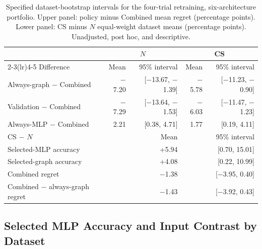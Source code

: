\begin{table}[tbp]
\centering
\caption{Specified dataset-bootstrap intervals for the four-trial retraining, six-architecture portfolio. Upper panel: policy minus Combined mean regret (percentage points). Lower panel: CS minus $N$ equal-weight dataset means (percentage points). Unadjusted, post hoc, and descriptive.}
\label{tab:mlp_budget_intervals}
\small
\begin{tabular}{@{}lrrrr@{}}
\toprule
 & \multicolumn{2}{c}{$N$} & \multicolumn{2}{c}{CS} \\
\cmidrule(lr){2-3}\cmidrule(lr){4-5}
Difference & Mean & 95\% interval & Mean & 95\% interval \\
\midrule
Always-graph $-$ Combined & $-$7.20 & [$-$13.67, $-$1.39] & $-$5.78 & [$-$11.23, $-$0.90] \\
Validation $-$ Combined & $-$7.29 & [$-$13.64, $-$1.53] & $-$6.03 & [$-$11.47, $-$1.23] \\
Always-MLP $-$ Combined & 2.21 & [0.38, 4.71] & 1.77 & [0.19, 4.11] \\
\midrule
CS $-$ $N$ & \multicolumn{2}{r}{Mean} & \multicolumn{2}{r}{95\% interval} \\
\midrule
Selected-MLP accuracy & \multicolumn{2}{r}{+5.94} & \multicolumn{2}{r}{[0.70, 15.01]} \\
Selected-graph accuracy & \multicolumn{2}{r}{+4.08} & \multicolumn{2}{r}{[0.22, 10.99]} \\
Combined regret & \multicolumn{2}{r}{$-$1.38} & \multicolumn{2}{r}{[$-$3.95, 0.40]} \\
Combined $-$ always-graph regret & \multicolumn{2}{r}{$-$1.43} & \multicolumn{2}{r}{[$-$3.92, 0.43]} \\
\bottomrule
\end{tabular}
\end{table}

\subsection{Selected MLP Accuracy and Input Contrast by Dataset}

